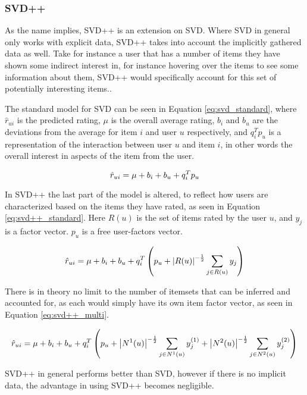 \subsubsection{SVD++} \label{bg:mf_svd++}
As the name implies, SVD++ is an extension on SVD. Where SVD in general only works with explicit data, SVD++ takes into account the implicitly gathered data as well. Take for instance a user that has a number of items they have shown some indirect interest in, for instance hovering over the items to see some information about them, SVD++ would specifically account for this set of potentially interesting items.\cite{recsyshandbook}.

 
The standard model for SVD can be seen in Equation \ref{eq:svd_standard}, where $\hat{r}_{ui}$ is the predicted rating, $\mu$ is the overall average rating, $b_{i}$ and $b_{u}$ are the deviations from the average for item $i$ and user $u$ respectively, and $q_{i}^{T}p_{u}$ is a representation of the interaction between user $u$ and item $i$, in other words the overall interest in aspects of the item from the user.

\begin{equation} \label{eq:svd_standard}
\centering
\hat{r}_{ui} = \mu + b_{i} + b_{u} + q_{i}^{T}p_{u}
\end{equation}

In SVD++ the last part of the model is altered, to reflect how users are characterized based on the items they have rated, as seen in Equation \ref{eq:svd++_standard}. Here $R(u)$ is the set of items rated by the user $u$, and $y_{j}$ is a factor vector. $p_{u}$ is a free user-factors vector.

\begin{equation} \label{eq:svd++_standard}
\centering
\hat{r}_{ui} = \mu + b_{i} + b_{u} + q_{i}^{T}\left (p_{u} + \left | R(u) \right |^{-\frac{1}{2}} \sum_{j\in R(u)} y_{j} \right )
\end{equation}

There is in theory no limit to the number of itemsets that can be inferred and accounted for, as each would simply have its own item factor vector, as seen in Equation \ref{eq:svd++_multi}.

\begin{equation} \label{eq:svd++_multi}
\centering
\hat{r}_{ui} = \mu + b_{i} + b_{u} + q_{i}^{T}\left (p_{u} + \left | N^{1}(u) \right |^{-\frac{1}{2}} \sum_{j\in N^{1}(u)} y_{j}^{(1)} + \left | N^{2}(u) \right |^{-\frac{1}{2}} \sum_{j\in N^{2}(u)} y_{j}^{(2)} \right )
\end{equation}

SVD++ in general performs better than SVD, however if there is no implicit data, the advantage in using SVD++ becomes negligible.